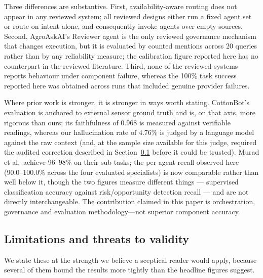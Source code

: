 \documentclass[preprint,12pt]{elsarticle}
\begin{document}
Three differences are substantive. First, availability-aware routing does
not appear in any reviewed system; all reviewed designs either run a fixed
agent set or route on intent alone, and consequently invoke agents over
empty sources. Second, AgroAskAI's Reviewer agent is the only reviewed
governance mechanism that changes execution, but it is evaluated by counted
mentions across 20 queries rather than by any reliability measure; the
calibration figure reported here has no counterpart in the reviewed
literature. Third, none of the reviewed systems reports behaviour under
component failure, whereas the 100\% task success reported here was
obtained across runs that included genuine provider failures.

Where prior work is stronger, it is stronger in ways worth stating.
CottonBot's evaluation is anchored to external sensor ground truth and is,
on that axis, more rigorous than ours; its faithfulness of 0.968 is
measured against verifiable readings, whereas our hallucination rate of
4.76\% is judged by a language model against the raw context (and, at the
sample size available for this judge, required the audited correction
described in Section~\ref{sec:limitations} before it could be trusted).
Murad et al.\ achieve 96--98\% on their sub-tasks; the per-agent recall
observed here (90.0--100.0\% across the four evaluated specialists) is
now comparable rather than well below it, though the two figures measure
different things --- supervised classification accuracy against
risk/opportunity detection recall --- and are not directly interchangeable.
The contribution claimed in this paper is orchestration,
governance and evaluation methodology---not superior component accuracy.

\subsection{Limitations and threats to validity}
\label{sec:limitations}

We state these at the strength we believe a sceptical reader would apply,
because several of them bound the results more tightly than the headline
figures suggest.
\end{document}
